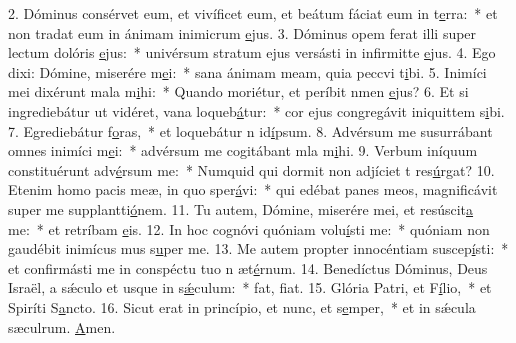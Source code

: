 2. Dóminus consérvet eum, et vivíficet eum, et beátum fáciat eum in t\uline{e}rra:~* et non tradat eum in ánimam inimicrum \uline{e}jus.
3. Dóminus opem ferat illi super lectum dolóris \uline{e}jus:~* univérsum stratum ejus versásti in infirmitte \uline{e}jus.
4. Ego dixi: Dómine, miserére m\uline{e}i:~* sana ánimam meam, quia peccvi t\uline{i}bi.
5. Inimíci mei dixérunt mala m\uline{i}hi:~* Quando moriétur, et períbit nmen \uline{e}jus?
6. Et si ingrediebátur ut vidéret, vana loqueb\uline{á}tur:~* cor ejus congregávit iniquittem s\uline{i}bi.
7. Egrediebátur f\uline{o}ras,~* et loquebátur n id\uline{í}psum.
8. Advérsum me susurrábant omnes inimíci m\uline{e}i:~* advérsum me cogitábant mla m\uline{i}hi.
9. Verbum iníquum constituérunt adv\uline{é}rsum me:~* Numquid qui dormit non adjíciet t res\uline{ú}rgat?
10. Etenim homo pacis meæ, in quo sper\uline{á}vi:~* qui edébat panes meos, magnificávit super me supplantti\uline{ó}nem.
11. Tu autem, Dómine, miserére mei, et resúscit\uline{a} me:~* et retríbam \uline{e}is.
12. In hoc cognóvi quóniam volu\uline{í}sti me:~* quóniam non gaudébit inimícus mus s\uline{u}per me.
13. Me autem propter innocéntiam suscep\uline{í}sti:~* et confirmásti me in conspéctu tuo n æt\uline{é}rnum.
14. Benedíctus Dóminus, Deus Israël, a sǽculo et usque in s\uline{ǽ}culum:~* fat, f\uline{i}at.
15. Glória Patri, et F\uline{í}lio,~* et Spiríti S\uline{a}ncto.
16. Sicut erat in princípio, et nunc, et s\uline{e}mper,~* et in sǽcula sæculrum. \uline{A}men.
